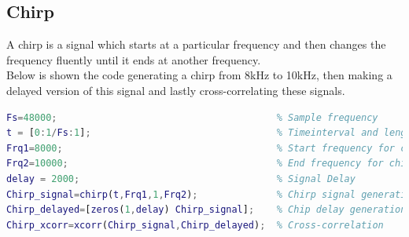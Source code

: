 \subsection{Chirp}
A chirp is a signal which starts at a particular frequency and then changes the frequency fluently until it ends at another frequency.\\
Below is shown the code generating a chirp from 8kHz to 10kHz, then making a delayed version of this signal and lastly cross-correlating these signals.\\
\begin{lstlisting}[language=Matlab,frame=lrtb,label=Matlab Code for Chirp Cross-correlation]
Fs=48000;                                       % Sample frequency
t = [0:1/Fs:1];                                 % Timeinterval and length
Frq1=8000;                                      % Start frequency for chirp
Frq2=10000;                                     % End frequency for chirp
delay = 2000;                                   % Signal Delay
Chirp_signal=chirp(t,Frq1,1,Frq2);              % Chirp signal generation
Chirp_delayed=[zeros(1,delay) Chirp_signal];    % Chip delay generation
Chirp_xcorr=xcorr(Chirp_signal,Chirp_delayed);  % Cross-correlation
\end{lstlisting}

